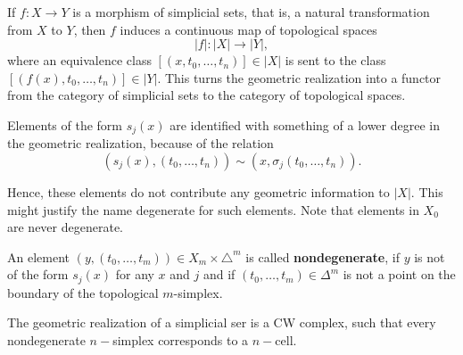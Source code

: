 If $f: X \rightarrow Y$ is a morphism of simplicial sets, that is, a natural transformation from $X$ to $Y$, then $f$ induces a continuous map of topological spaces
$$
|f|:|X| \rightarrow|Y|,
$$
where an equivalence class $\left[\left(x, t_0, \ldots, t_n\right)\right] \in|X|$ is sent to the class $\left[\left(f(x), t_0, \ldots, t_n\right)\right] \in|Y|$. This turns the geometric realization into a functor from the category of simplicial sets to the category of topological spaces.

Elements of the form $s_j(x)$ are identified with something of a lower degree in the geometric realization, because of the relation
$$
\left(s_j(x),\left(t_0, \ldots, t_n\right)\right) \sim\left(x, \sigma_j\left(t_0, \ldots, t_n\right)\right) .
$$

Hence, these elements do not contribute any geometric information to $|X|$. This might justify the name degenerate for such elements. Note that elements in $X_0$ are never degenerate.

An element $\left(y,\left(t_0, \ldots, t_m\right)\right) \in X_m \times \triangle^m$ is called \textbf{nondegenerate}, if $y$ is not of the form $s_j(x)$ for any $x$ and $j$ and if $\left(t_0, \ldots, t_m\right) \in \Delta^m$ is not a point on the boundary of the topological $m$-simplex.

\begin{prop}
    The geometric realization of a simplicial ser is a CW complex, such that every nondegenerate $n-$simplex corresponds to a $n-$cell.
\end{prop}

